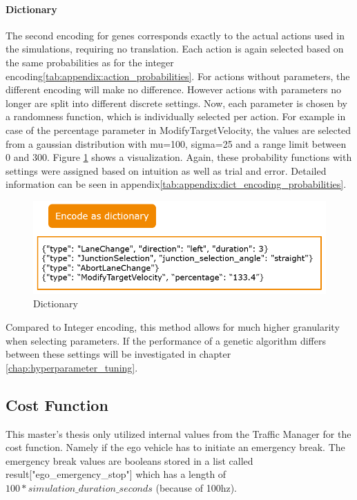 \paragraph{Dictionary}
The second encoding for genes corresponds exactly to the actual actions used in the simulations, requiring no translation. Each action is again selected based on the same probabilities as for the integer encoding\ref{tab:appendix:action_probabilities}. For actions without parameters, the different encoding will make no difference. However actions with parameters no longer are split into different discrete settings. Now, each parameter is chosen by a randomness function, which is individually selected per action. For example in case of the percentage parameter in ModifyTargetVelocity, the values are selected from a gaussian distribution with mu=100, sigma=25 and a range limit between 0 and 300. Figure \ref{fig:implementation:encoding_gene_dict} shows a visualization. Again, these probability functions with settings were assigned based on intuition as well as trial and error. Detailed information can be seen in appendix\ref{tab:appendix:dict_encoding_probabilities}.

\begin{figure}[ht] 
	\includegraphics[width=1\linewidth]{figures/dict_encoding}
	\caption{Dictionary}
	\label{fig:implementation:encoding_gene_dict}
\end{figure}

Compared to Integer encoding, this method allows for much higher granularity when selecting parameters. If the performance of a genetic algorithm differs between these settings will be investigated in chapter \ref{chap:hyperparameter_tuning}.

\subsection{Cost Function}
\label{sect:implementation:cost_function}
This master's thesis only utilized internal values from the Traffic Manager for the cost function. Namely if the ego vehicle has to initiate an emergency break. The emergency break values are booleans stored in a list called result["ego\_emergency\_stop"] which has a length of $100 * simulation\_duration\_seconds$ (because of 100hz). 

